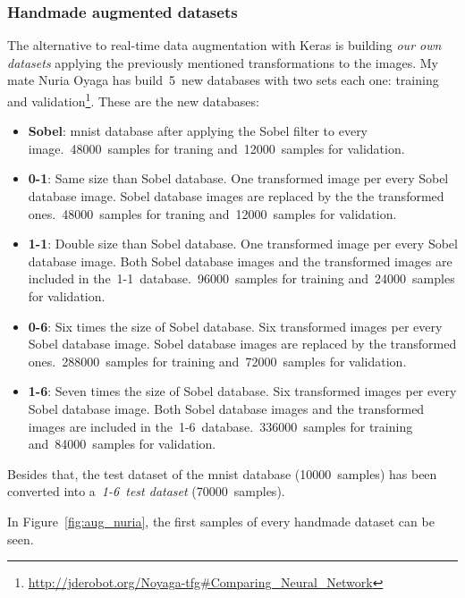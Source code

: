 \subsubsection{Handmade augmented datasets}\label{subsec:handmade}
The alternative to real-time data augmentation with Keras is building \emph{our own datasets} applying the previously mentioned transformations to the images. My mate Nuria Oyaga has build~5~new databases with two sets each one: training and validation\footnote{\url{http://jderobot.org/Noyaga-tfg\#Comparing_Neural_Network}}. These are the new databases: 
\begin{itemize}
	\item \textbf{Sobel}: \gls{mnist} database after applying the Sobel filter to every image.~48000~samples for traning and~12000~samples for validation. 
	\item \textbf{0-1}: Same size than Sobel database. One transformed image per every Sobel database image. Sobel database images are replaced by the the transformed ones.~48000~samples for traning and~12000~samples for validation. 
	\item \textbf{1-1}: Double size than Sobel database. One transformed image per every Sobel database image. Both Sobel database images and the transformed images are included in the~1-1~database.~96000~samples for training and~24000~samples for validation. 
	\item \textbf{0-6}: Six times the size of Sobel database. Six transformed images per every Sobel database image. Sobel database images are replaced by the transformed ones.~288000~samples for training and~72000~samples for validation. 
	\item \textbf{1-6}: Seven times the size of Sobel database. Six transformed images per every Sobel database image. Both Sobel database images and the transformed images are included in the~1-6~database.~336000~samples for training and~84000~samples for validation. 
\end{itemize}

Besides that, the test dataset of the \gls{mnist} database (10000~samples) has been converted into a~\emph{1-6~test dataset} (70000~samples).

In Figure~\ref{fig:aug_nuria}, the first samples of every handmade dataset can be seen.

